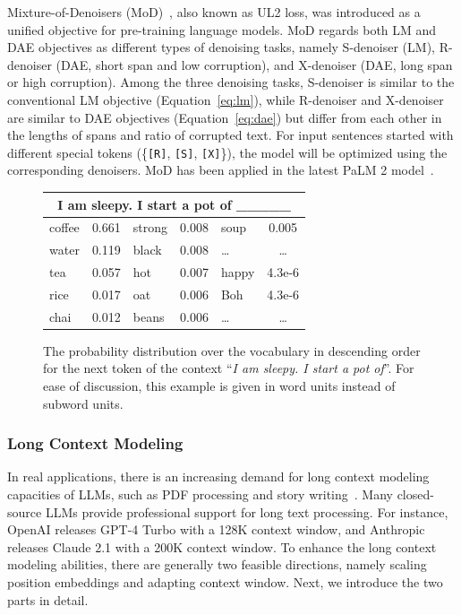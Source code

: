 {{ Mixture-of-Denoisers (MoD)~\cite{Tay-arxiv-2022-UL2}, also  known as  UL2 loss, was introduced as a unified objective for pre-training language models. MoD regards both LM and DAE objectives as different types of denoising tasks, namely  %
{S-denoiser (LM), R-denoiser (DAE, short span and low corruption), and X-denoiser (DAE, long span or high corruption).}
Among the three denoising tasks, S-denoiser is similar to the conventional LM objective (Equation~\eqref{eq:lm}), while R-denoiser and X-denoiser are similar to DAE objectives (Equation~\eqref{eq:dae}) but differ from each other in the lengths of spans and ratio of corrupted text.  
{For input sentences started with different special tokens (\ie \{\texttt{[R]}, \texttt{[S]}, \texttt{[X]}\}), the model will be optimized using the corresponding denoisers.} 
MoD has been  
applied in the latest PaLM 2 model~\cite{Anil-arxiv-2023-palm2}.


\begin{figure}
    \centering
    \begin{tabular}{lc|lc|lc}
    \multicolumn{6}{c}{I am sleepy. I start a pot of \_\_\_\_\_} \\
    \midrule[0.3pt]
    coffee & 0.661 & strong & 0.008 & soup & 0.005 \\
    water & 0.119 & black & 0.008 & \dots & \dots \\
    tea & 0.057 & hot & 0.007 & happy & 4.3e-6 \\
    rice & 0.017 & oat & 0.006 & Boh & 4.3e-6 \\
    chai & 0.012 & beans & 0.006 & \dots & \dots \\
    \end{tabular}
    \caption{The probability distribution over the vocabulary in descending order for the next token of the context ``\emph{I am sleepy. I start a pot of}''. For ease of discussion, this example is given in word units instead of subword units. }
    \label{fig:decoding-example}
\end{figure}



\subsubsection{Long Context Modeling}
\label{sec:long_context}
In real applications, there is an increasing demand for long context modeling capacities of LLMs,  such as PDF processing and story writing~\cite{Yuan-2022-IUI-Wordcraft}. Many closed-source LLMs provide professional support for long text processing. For instance, OpenAI releases GPT-4 Turbo  with a 128K context window, and Anthropic releases Claude 2.1 with a 200K  context window. To enhance the long context modeling abilities, there are generally two feasible directions, namely scaling position embeddings and adapting context window. Next, we introduce the two parts in detail.  









}}
